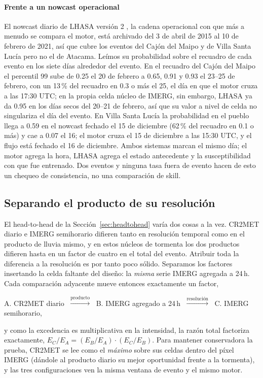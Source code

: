 \documentclass[authoryear,preprint,review,12pt]{elsarticle}
\begin{document}
\paragraph{Frente a un nowcast operacional}
El nowcast diario de LHASA versión 2 \citep{stanley2021,lhasa2023data}, la cadena
operacional con que más a menudo se compara el motor, está archivado del 3 de abril de
2015 al 10 de febrero de 2021, así que cubre los eventos del Cajón del Maipo y de Villa
Santa Lucía pero no el de Atacama. Leímos su probabilidad sobre el recuadro de cada
evento en los siete días alrededor del evento. En el recuadro del Cajón del Maipo el
percentil 99 sube de 0.25 el 20 de febrero a 0.65, 0.91 y 0.93 el 23--25 de febrero,
con un 13\,\% del recuadro en 0.3 o más el 25, el día en que el motor cruza a las 17:30
UTC; en la propia celda núcleo de IMERG, sin embargo, LHASA ya da 0.95 en los días
secos del 20--21 de febrero, así que su valor a nivel de celda no singulariza el día
del evento. En Villa Santa Lucía la probabilidad en el pueblo llega a 0.59 en el nowcast
fechado el 15 de diciembre (62\,\% del recuadro en 0.1 o más) y cae a 0.07 el 16; el motor
cruza el 15 de diciembre a las 15:30 UTC, y el flujo está fechado el 16 de diciembre.
Ambos sistemas marcan el mismo día; el motor agrega la hora, LHASA agrega el estado
antecedente y la susceptibilidad con que fue entrenado. Dos eventos y ninguna tasa
fuera de evento hacen de esto un chequeo de consistencia, no una comparación de skill.

\subsection{Separando el producto de su resolución}
\label{sec:singlefactor}

El head-to-head de la Sección~\ref{sec:headtohead} varía dos cosas a la vez. CR2MET
diario e IMERG semihorario difieren tanto en resolución temporal como en el
producto de lluvia mismo, y en estos núcleos de tormenta los dos productos difieren
hasta en un factor de cuatro en el total del evento. Atribuir toda la diferencia a
la resolución es por tanto poco sólido. Separamos los factores insertando la celda
faltante del diseño: la \emph{misma} serie IMERG agregada a 24\,h. Cada comparación
adyacente mueve entonces exactamente un factor,
\begin{center}
A. CR2MET diario $\;\xrightarrow{\text{producto}}\;$ B. IMERG agregado a 24\,h
$\;\xrightarrow{\text{resolución}}\;$ C. IMERG semihorario,
\end{center}
y como la excedencia es multiplicativa en la intensidad, la razón total factoriza
exactamente, $E_C/E_A = (E_B/E_A)\cdot(E_C/E_B)$. Para mantener conservadora la
prueba, CR2MET se lee como el \emph{máximo} sobre sus celdas dentro del píxel IMERG
(dándole al producto diario su mejor oportunidad frente a la tormenta), y las tres
configuraciones ven la misma ventana de evento y el mismo motor.
\end{document}
